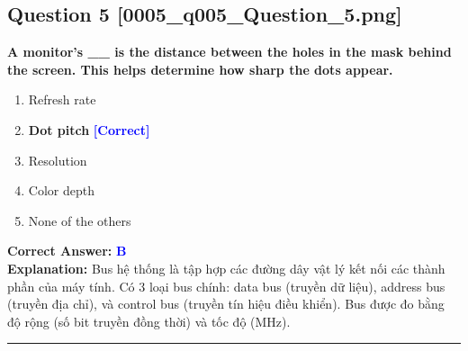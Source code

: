 \documentclass[11pt,a4paper]{article}
\begin{document}
\begin{minipage}{\textwidth}
\subsection*{Question 5 \quad \footnotesize{[0005\_q005\_Question\_5.png]}}
\noindent \textbf{A monitor's \_\_ is the distance between the holes in the mask behind the screen. This helps determine how sharp the dots appear.}

\begin{enumerate}[label=\Alph*.]
    \item Refresh rate
    \item \textbf{Dot pitch} \hfill \textcolor{blue}{\textbf{[Correct]}}
    \item Resolution
    \item Color depth
    \item None of the others
\end{enumerate}

\noindent \textbf{Correct Answer:} \textcolor{blue}{\textbf{B}} \\[2pt]
\noindent \textbf{Explanation:} Bus hệ thống là tập hợp các đường dây vật lý kết nối các thành phần của máy tính. Có 3 loại bus chính: data bus (truyền dữ liệu), address bus (truyền địa chỉ), và control bus (truyền tín hiệu điều khiển). Bus được đo bằng độ rộng (số bit truyền đồng thời) và tốc độ (MHz).

\par\vspace{0.3cm}
\hrule
\vspace{0.3cm}
\end{minipage}
\end{document}
